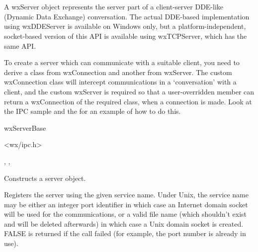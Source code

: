 \section{}\label{wxddeserver}

A wxServer object represents the server part of a client-server
DDE-like (Dynamic Data Exchange) conversation. The actual
DDE-based implementation using wxDDEServer is available on Windows
only, but a platform-independent, socket-based version of this
API is available using wxTCPServer, which has the same API.

To create a server which can communicate with a suitable client,
you need to derive a class from wxConnection and another from
wxServer. The custom wxConnection class will intercept
communications in a `conversation' with a client, and the custom
wxServer is required so that a user-overridden  
member can return a wxConnection of the required class, when a
connection is made. Look at the IPC sample and the  for
an example of how to do this.


wxServerBase


<wx/ipc.h>


,
, 




Constructs a server object.



Registers the server using the given service name. Under Unix,
the service name may be either an integer port identifier in
which case an Internet domain socket will be used for the
communications, or a valid file name (which shouldn't exist and
will be deleted afterwards) in which case a Unix domain socket is
created. FALSE is returned if the call failed (for example, the
port number is already in use).

\label{wxddeserveronacceptconnection}

